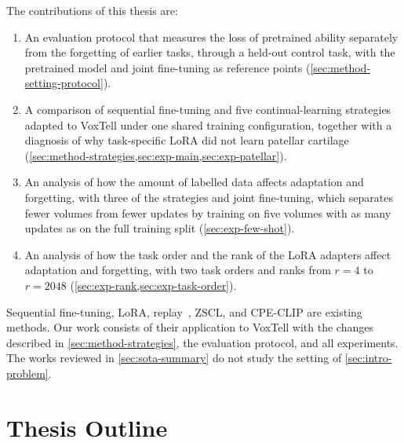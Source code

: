The contributions of this thesis are:
\begin{enumerate}
  \item An evaluation protocol that measures the loss of pretrained ability separately from the forgetting of earlier tasks, through a held-out control task, with the pretrained model and joint fine-tuning as reference points (\cref{sec:method-setting-protocol}).
  \item A comparison of sequential fine-tuning and five continual-learning strategies adapted to VoxTell under one shared training configuration, together with a diagnosis of why task-specific LoRA did not learn patellar cartilage (\cref{sec:method-strategies,sec:exp-main,sec:exp-patellar}).
  \item An analysis of how the amount of labelled data affects adaptation and forgetting, with three of the strategies and joint fine-tuning, which separates fewer volumes from fewer updates by training on five volumes with as many updates as on the full training split (\cref{sec:exp-few-shot}).
  \item An analysis of how the task order and the rank of the LoRA adapters affect adaptation and forgetting, with two task orders and ranks from $r = 4$ to $r = 2048$ (\cref{sec:exp-rank,sec:exp-task-order}).
\end{enumerate}

Sequential fine-tuning, LoRA, replay~\cite[Sec.~3.1]{delange2022}, ZSCL, and CPE-CLIP are existing methods.
Our work consists of their application to VoxTell with the changes described in \cref{sec:method-strategies}, the evaluation protocol, and all experiments.
The works reviewed in \cref{sec:sota-summary} do not study the setting of \cref{sec:intro-problem}.

\section{Thesis Outline}
\label{sec:intro-outline}

